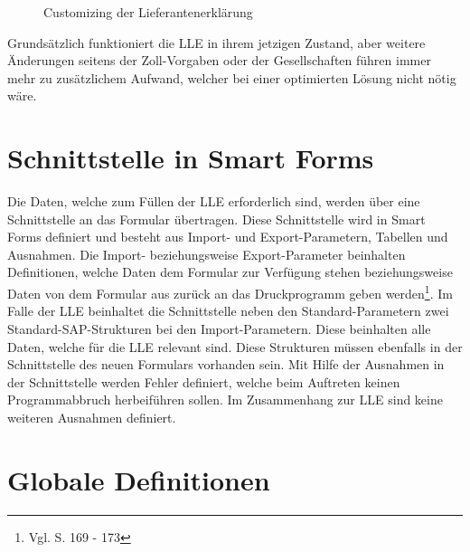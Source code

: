 		
	\begin{figure}[ht]
		\centering
		\caption{Customizing der Lieferantenerklärung }
		\label{fig4}
	\end{figure}

	Grundsätzlich funktioniert die \ac{LLE} in ihrem jetzigen Zustand, aber weitere Änderungen seitens der Zoll-Vorgaben oder der Gesellschaften führen immer mehr zu zusätzlichem Aufwand, welcher bei einer optimierten Lösung nicht nötig wäre. 

	\FloatBarrier
	
	\section{Schnittstelle in Smart Forms}
	
	Die Daten, welche zum Füllen der \ac{LLE} erforderlich sind, werden über eine Schnittstelle an das Formular übertragen. Diese Schnittstelle wird in Smart Forms definiert und besteht aus Import- und Export-Parametern, Tabellen und Ausnahmen. Die Import- beziehungsweise Export-Parameter beinhalten Definitionen, welche Daten dem Formular zur Verfügung stehen beziehungsweise Daten von dem Formular aus zurück an das Druckprogramm geben werden\footnote{Vgl. \cite{Hertleif.2003} S. 169 - 173}. Im Falle der \ac{LLE} beinhaltet die Schnittstelle neben den Standard-Parametern zwei Standard-SAP-Strukturen bei den Import-Parametern. Diese beinhalten alle Daten, welche für die \ac{LLE} relevant sind. Diese Strukturen müssen ebenfalls in der Schnittstelle des neuen Formulars vorhanden sein. Mit Hilfe der Ausnahmen in der Schnittstelle werden Fehler definiert, welche beim Auftreten keinen Programmabbruch herbeiführen sollen. Im Zusammenhang zur \ac{LLE} sind keine weiteren Ausnahmen definiert.    
	\section{Globale Definitionen}
	

